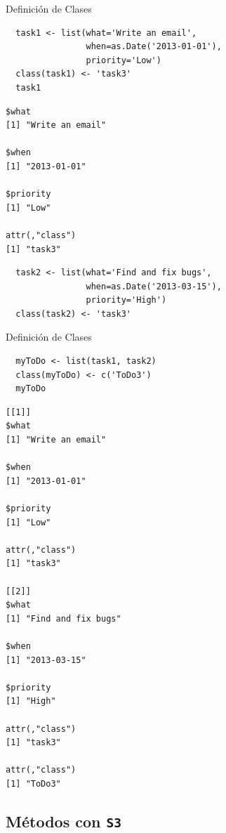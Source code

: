 \documentclass[xcolor={usenames,svgnames,dvipsnames}]{beamer}
\begin{document}
\begin{frame}[fragile,label={sec:orgheadline7}]{Definición de Clases}
 \lstset{language=R,label= ,caption= ,captionpos=b,numbers=none}
\begin{lstlisting}
  task1 <- list(what='Write an email',
                when=as.Date('2013-01-01'),
                priority='Low')
  class(task1) <- 'task3'
  task1
\end{lstlisting}

\begin{verbatim}
$what
[1] "Write an email"

$when
[1] "2013-01-01"

$priority
[1] "Low"

attr(,"class")
[1] "task3"
\end{verbatim}

\lstset{language=R,label= ,caption= ,captionpos=b,numbers=none}
\begin{lstlisting}
  task2 <- list(what='Find and fix bugs',
                when=as.Date('2013-03-15'),
                priority='High')
  class(task2) <- 'task3'
\end{lstlisting}
\end{frame}

\begin{frame}[fragile,label={sec:orgheadline8}]{Definición de Clases}
 \lstset{language=R,label= ,caption= ,captionpos=b,numbers=none}
\begin{lstlisting}
  myToDo <- list(task1, task2)
  class(myToDo) <- c('ToDo3')
  myToDo
\end{lstlisting}

\begin{verbatim}
[[1]]
$what
[1] "Write an email"

$when
[1] "2013-01-01"

$priority
[1] "Low"

attr(,"class")
[1] "task3"

[[2]]
$what
[1] "Find and fix bugs"

$when
[1] "2013-03-15"

$priority
[1] "High"

attr(,"class")
[1] "task3"

attr(,"class")
[1] "ToDo3"
\end{verbatim}
\end{frame}

\subsection{Métodos con \texttt{S3}}
\label{sec:orgheadline15}
\end{document}
